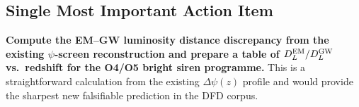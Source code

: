 \documentclass[11pt]{article}
\begin{document}
\subsection{Single Most Important Action Item}

\textbf{Compute the EM--GW luminosity distance discrepancy from the
existing $\psi$-screen reconstruction and prepare a table of
$D_L^{\rm EM}/D_L^{\rm GW}$ vs.\ redshift for the O4/O5 bright siren
programme.}  This is a straightforward calculation from the existing
$\Delta\psi(z)$ profile and would provide the sharpest new falsifiable
prediction in the DFD corpus.
\end{document}
